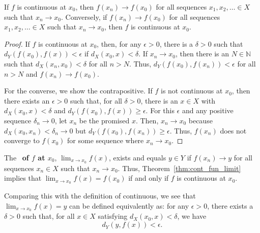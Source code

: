 \begin{theorem} \label{thm:cont_fun_limit}
If $f$ is continuous at $x_0$, then $f(x_n) \to f(x_0)$ for all sequences $x_1,x_2,\ldots \in X$ such that $x_n \to x_0$.
Conversely, if $f(x_n) \to f(x_0)$ for all sequences $x_1,x_2,\ldots  \in X$ such that $x_n \to x_0$, then $f$ is continuous at $x_0$.
\end{theorem}
\begin{proof}
If $f$ is continuous at $x_0$, then, for any $\epsilon > 0$, there is a $\delta >0$ such that $d_Y (f(x_0),f(x)) < \epsilon$ if $d_X (x_0,x) < \delta$.
If $x_n \to x_0$, then there is an $N\in \mathbb{N}$ such that $d_X (x_n,x_0) < \delta$ for all $n>N$.
Thus, $d_Y (f(x_0),f(x_n)) < \epsilon$ for all $n>N$ and $f(x_n) \to f(x_0)$.

For the converse, we show the contrapositive.
If $f$ is not continuous at $x_0$, then there exists an $\epsilon >0$ such that, for all $\delta >0$, there is an $x\in X$ with $d_X (x_0,x) < \delta$ and $d_Y (f(x_0),f(x))\geq \epsilon$.
For this $\epsilon$ and any positive sequence $\delta_n \to 0$, let $x_n$ be the promised $x$.
Then, $x_n \to x_0$ because $d_X (x_0,x_n)<\delta_n \to 0$ but $d_Y (f(x_0),f(x_n))\geq \epsilon$.
Thus, $f(x_n)$ does not converge to $f(x_0)$ for some sequence where $x_n \to x_0$.
\end{proof}

\begin{definition} \label{def:cont_limit}
\boldmath
The ~\textbf{of $f$ at $x_0$},
\unboldmath
$\lim_{x \to x_0} f(x)$, exists and equals $y\in Y$ if $f(x_n) \to y$ for all sequences $x_n \in X$ such that $x_n \to x_0$.
Thus, Theorem~\ref{thm:cont_fun_limit} implies that $\lim_{x\to x_0} f(x)=f(x_0)$ if and only if $f$ is continuous at $x_0$.
\end{definition}


\begin{remark}
Comparing this with the definition of continuous, we see that $\lim_{x\to x_0} f(x)=y$ can be defined equivalently as:
for any $\epsilon> 0$, there exists a $\delta >0$ such that, for all $x\in X$ satisfying $d_X(x_0,x)< \delta$, we have
\[ d_Y \left( y,f(x) \right) < \epsilon .\]
\end{remark}



